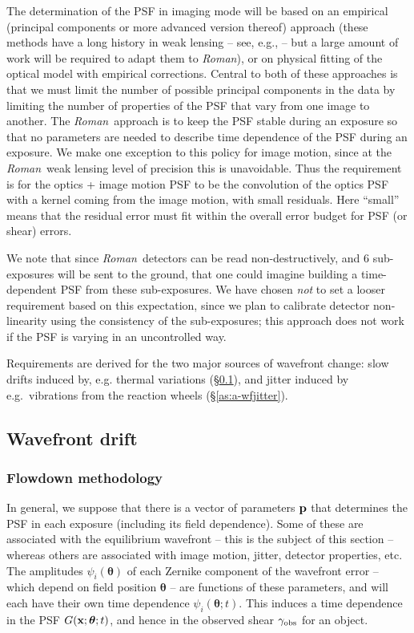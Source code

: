 \documentclass[usenatbib]{mnras}
\newcommand{\wfirst}{{\slshape Roman}}
\begin{document}
The determination of the PSF in imaging mode will be based on an empirical (principal components or more advanced version thereof) approach (these methods have a long history in weak lensing -- see, e.g., \citealt{2004astro.ph.12234J, 2007PASP..119.1403J} -- but a large amount of work will be required to adapt them to \wfirst), or on physical fitting of the optical model \citep{2012SPIE.8442E..10J} with empirical corrections. Central to both of these approaches is that we must limit the number of possible principal components in the data by limiting the number of properties of the PSF that vary from one image to another. The \wfirst\ approach is to keep the PSF stable during an exposure so that no parameters are needed to describe time dependence of the PSF during an exposure. We make one exception to this policy for image motion, since at the \wfirst\ weak lensing level of precision this is unavoidable. Thus the requirement is for the optics + image motion PSF to be the convolution of the optics PSF with a kernel coming from the image motion, with small residuals. Here ``small'' means that the residual error must fit within the overall error budget for PSF (or shear) errors.

We note that since \wfirst\ detectors can be read non-destructively, and 6 sub-exposures will be sent to the ground, that one could imagine building a time-dependent PSF from these sub-exposures. We have chosen {\em not} to set a looser requirement based on this expectation, since we plan to calibrate detector non-linearity using the consistency of the sub-exposures; this approach does not work if the PSF is varying in an uncontrolled way.

Requirements are derived for the two major sources of wavefront change: slow drifts induced by, e.g. thermal variations (\S\ref{as:a-drift}), and jitter induced by e.g.\ vibrations from the reaction wheels (\S\ref{as:a-wfjitter}).

\subsection{Wavefront drift}
\label{as:a-drift}

\subsubsection{Flowdown methodology}
\label{as:drift-method}

In general, we suppose that there is a vector of parameters ${\bf p}$
that determines the PSF in each exposure (including its field
dependence). Some of these are associated with the equilibrium
wavefront -- this is the subject of this section -- whereas others are
associated with image motion, jitter, detector properties, etc. The
amplitudes $\psi_i({\boldsymbol\theta})$ of each Zernike component of
the wavefront error -- which depend on field position
${\boldsymbol\theta}$ -- are functions of these parameters, and will
each have their own time dependence
$\psi_i({\boldsymbol\theta};t)$. This induces a time dependence in the
PSF $G({\bf x};{\boldsymbol\theta};t)$, and hence in the observed
shear $\gamma_{\rm obs}$ for an object.
\end{document}
